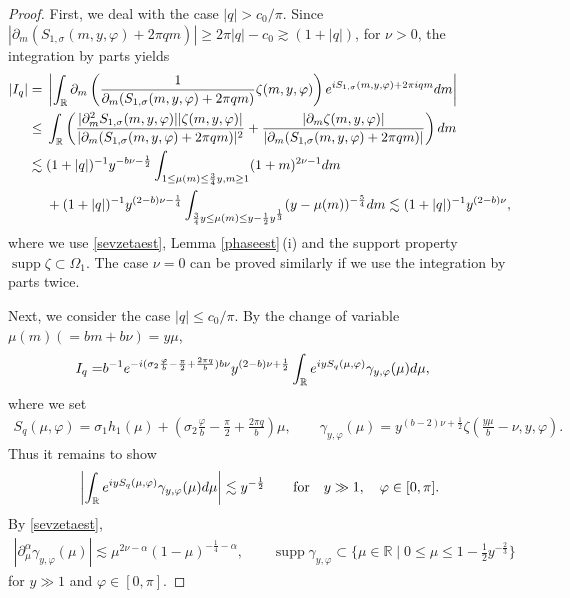 \documentclass[10pt,a4paper]{article}
\numberwithin{equation}{section}
\def\R{\mathbb{R}}%
\DeclareMathOperator{\supp}{supp}%
\def\a{\alpha}
\def\c{\gamma}
\def\f{\varphi}
\def\m{\mu}
\def\n{\nu}
\def\s{\sigma}
\def\z{\zeta}
\def\pa{\partial}
\begin{document}
\begin{proof}
First, we deal with the case $|q|> c_0/\pi$. Since $|\pa_m(S_{1,\s}(m,y,\f)+2\pi qm)|\geq 2\pi|q|-c_0\gtrsim (1+|q|)$, for $\n>0$, the integration by parts yields
\begin{align*}
|I_{q}|={}&\left|\int_{\R}\pa_m\left(\frac{1}{\pa_m(S_{1,\s}(m,y,\f)+2\pi qm) } \z(m,y,\f)\right) {\rm e}^{{\rm i}S_{1,\s}(m,y,\f)+2\pi {\rm i}qm}{\rm d}m \right| \\
\leq{}&\int_{\R}\left(\frac{|\pa_m^2S_{1,\s}(m,y,\f)||\z(m,y,\f)|}{|\pa_m(S_{1,\s}(m,y,\f)+2\pi qm)|^2 } +\frac{|\pa_m\z(m,y,\f)|}{|\pa_m(S_{1,\s}(m,y,\f)+2\pi qm)|} \right) {\rm d}m \\
\lesssim{}& (1+|q|)^{-1} y^{-b\n-\frac{1}{2}}\int_{1\leq\m(m)\leq \frac{3}{4}y,m\geq 1}%
(1+m)^{2\n-1}{\rm d}m \\
&+(1+|q|)^{-1}y^{(2-b)\n-\frac{1}{4}}\int_{\frac{3}{4}y\leq\m(m)\leq y-\frac{1}{2}y^{\frac{1}{3}}}(y-\m(m))^{-\frac{5}{4}}{\rm d}m\lesssim (1+|q|)^{-1}y^{(2-b)\n},
\end{align*}
where we use \eqref{sevzetaest}, Lemma \ref{phaseest}\,(i) and the support property $\supp\z\subset \Omega_1$.
The case $\n=0$ can be proved similarly if we use the integration by parts twice.


Next, we consider the case $|q|\leq c_0/\pi$. By the change of variable $\m(m)(=bm+b\n)=y\m$,
\begin{align*}%
I_q=&b^{-1}{\rm e}^{-{\rm i}(\s_2\frac{\f}{b}-\frac{\pi}{2}+\frac{2\pi q}{b})b\n} y^{(2-b)\n+\frac{1}{2}}\int_{\R}{\rm e}^{{\rm i}yS_q(\m,\f) }\c_{y,\f}(\m) {\rm d}\m,
\end{align*}
where we set
\begin{align*}
S_q(\m,\f)=\s_1h_1(\m) +\left(\s_2\frac{\f}{b}-\frac{\pi}{2}+\frac{2\pi q}{b}\right)\m,\qquad \c_{y,\f}(\m)=y^{(b-2)\n+\frac{1}{2}}\z\left(\frac{y\m}{b}-\n,y,\f\right).
\end{align*}
Thus it remains to show
\begin{align}\label{I_1stphase}
\left|\int_{\R}{\rm e}^{{\rm i}yS_q(\m,\f) }\c_{y,\f}(\m) {\rm d}\m\right|\lesssim y^{-\frac{1}{2}}\qquad \text{for}\quad y\gg 1,\quad \f\in [0,\pi].
\end{align}
By \eqref{sevzetaest},
\begin{align*}%
|\pa_\m^{\a}\c_{y,\f}(\m)|\lesssim \m^{2\n-\a}(1-\m)^{-\frac{1}{4}-\a},\qquad \supp \c_{y,\f}\subset \big\{\m\in\R\mid 0\leq \m\leq 1-\frac{1}{2}y^{-\frac{2}{3}} \big\}
\end{align*}
for $y\gg 1$ and $\f\in [0,\pi]$.


\end{proof}
\end{document}
